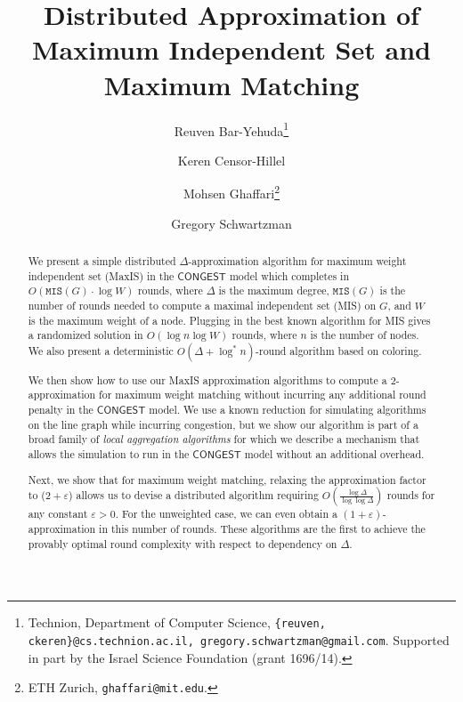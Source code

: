 \documentclass[11pt]{article}
\newcommand{\eps}{\varepsilon}
\newcommand*\samethanks[1][\value{footnote}]{\footnotemark[#1]}
\newcommand{\Wmax}{W}%
\newcommand{\MIS}{\texttt{MIS}(G)}
\begin{document}
\begin{titlepage}
	\title{Distributed Approximation of Maximum Independent Set and Maximum Matching }
	\author{Reuven Bar-Yehuda\thanks{Technion, Department of Computer Science, \texttt{\{reuven, ckeren\}@cs.technion.ac.il, gregory.schwartzman@gmail.com}. Supported in part by the Israel Science Foundation (grant 1696/14).}
		\and Keren Censor-Hillel\samethanks \and Mohsen Ghaffari\thanks{ETH Zurich, \texttt{ghaffari@mit.edu}.} \and Gregory Schwartzman\samethanks[1]}
		\date{}
	\maketitle
	
	\begin{abstract}
		We present a simple distributed $\Delta$-approximation algorithm for maximum weight independent set (MaxIS) in the $\mathsf{CONGEST}$ model which completes in $O(\MIS\cdot \log\Wmax)$ rounds, where $\Delta$ is the maximum degree, $\MIS$ is the number of rounds needed to compute a maximal independent set (MIS) on $G$, and $\Wmax$ is the maximum weight of a node. %
		Plugging in the best known algorithm for MIS gives a randomized solution in $O(\log n \log\Wmax)$ rounds, where $n$ is the number of nodes.
		We also present a deterministic $O(\Delta +\log^* n)$-round algorithm based on coloring.
		
		We then show how to use our MaxIS approximation algorithms to compute a $2$-approximation for maximum weight matching without incurring any additional round penalty in the $\mathsf{CONGEST}$ model. We use a known reduction for simulating algorithms on the line graph while incurring congestion, but we show our algorithm is part of a broad family of \emph{local aggregation algorithms} for which we describe a mechanism that allows the simulation to run in the $\mathsf{CONGEST}$ model without an additional overhead.
		
		Next, we show that for maximum weight matching, relaxing the approximation factor to ($2+\eps$) allows us to devise a distributed algorithm requiring $O(\frac{\log \Delta}{\log\log\Delta})$ rounds for any constant $\eps>0$. For the unweighted case, we can even obtain a $(1+\eps)$-approximation in this number of rounds. These algorithms are the first to achieve the
provably optimal round complexity with respect to dependency on $\Delta$.
	\end{abstract}
	\thispagestyle{empty}
	
\end{titlepage}
\end{document}
